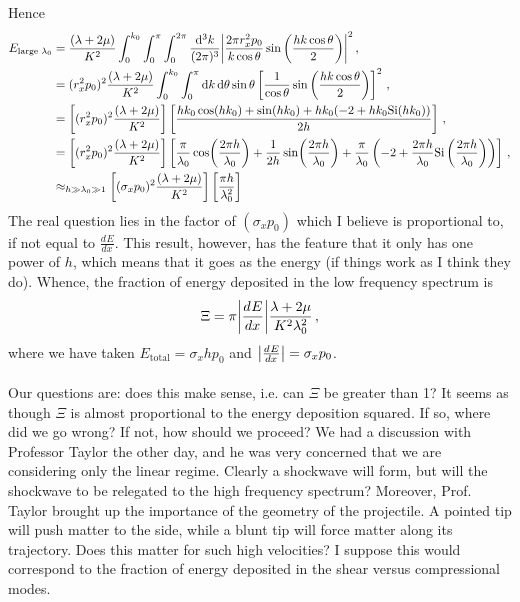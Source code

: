 \documentclass{article}
\newcommand*\diff{\mathop{}\!\mathrm{d}}
\newcommand*\te[1]{\text{#1}}
\newcommand*\p[1]{\left(#1\right)}
\newcommand*\ps[1]{\left[#1\right]}
\newcommand*\f[2]{\frac{#1}{#2}}
\newcommand*\td[3]{\frac{d^{#3}#1}{d #2^{#3}}}
\begin{document}
Hence
\begin{align}
E_{\te{large }\lambda_0}&=\f{(\lambda+2\mu)}{K^2}\int_{0}^{k_0}\int_{0}^{\pi}\int_{0}^{2\pi}\f{\diff^3 k}{(2\pi)^3}\abs{\f{2\pi r_x^2 p_0}{k\cos\theta}  \sin\p{\f{h k\cos\theta}{2}}}^2\,,\\
&=(r_x^2 p_0)^2\f{(\lambda+2\mu)}{K^2}\int_{0}^{k_0}\int_{0}^{\pi}\diff k\diff\theta \sin\theta\ps{\f{1}{\cos\theta}  \sin\p{\f{h k\cos\theta}{2}}}^2\,,\\
&=\ps{(r_x^2 p_0)^2\f{(\lambda+2\mu)}{K^2}}\ps{\f{hk_0\cos(hk_0)+\sin(hk_0)+hk_0(-2+hk_0\te{Si}(hk_0))}{2h}}\,,\\
&=\ps{(r_x^2 p_0)^2\f{(\lambda+2\mu)}{K^2}}\ps{\f{\pi }{\lambda_0}\cos(\f{2\pi h}{\lambda_0})+\f{1}{2h}\sin(\f{2\pi h}{\lambda_0})+\f{\pi }{\lambda_0}\p{-2+\f{2\pi h}{\lambda_0}\te{Si}\p{\f{2\pi h}{\lambda_0}}}}\,,\\
&\approx_{h\gg\lambda_0\gg1}\ps{(\sigma_x p_0)^2\f{(\lambda+2\mu)}{K^2}}\ps{\f{\pi h}{\lambda_0^2}}
\end{align}
The real question lies in the factor of $(\sigma_xp_0)$ which I believe is proportional to, if not equal to $\td{E}{x}{}$. This result, however, has the feature that it only has one power of $h$, which means that it goes as the energy (if things work as I think they do). Whence, the fraction of energy deposited in the low frequency spectrum is
\begin{align}
\Xi=\pi\abs{\td{E}{x}{}}\f{\lambda+2\mu}{K^2\lambda_0^2}\,,
\end{align}
where we have taken $E_{\te{total}}=\sigma_x h p_0$ and $\abs{\td{E}{x}{}}=\sigma_x p_0$.
\\\\
Our questions are: does this make sense, i.e. can $\Xi$ be greater than 1? It seems as though $\Xi$ is almost proportional to the energy deposition squared. If so, where did we go wrong? If not, how should we proceed? We had a discussion with Professor Taylor the other day, and he was very concerned that we are considering only the linear regime. Clearly a shockwave will form, but will the shockwave to be relegated to the high frequency spectrum?  Moreover, Prof. Taylor brought up the importance of the geometry of the projectile. A pointed tip will push matter to the side, while a blunt tip will force matter along its trajectory. Does this matter for such high velocities? I suppose this would correspond to the fraction of energy deposited in the shear versus compressional modes.
\end{document}
